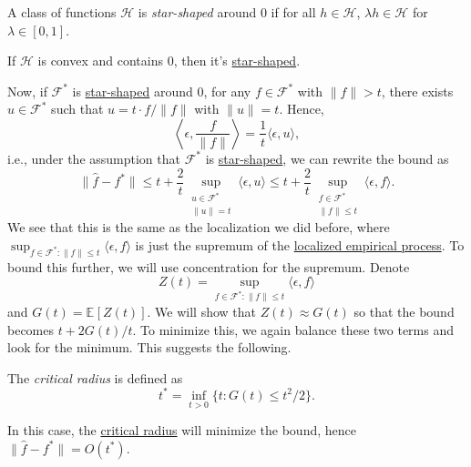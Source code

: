 \begin{definition}\label{def:star-shaped}
	A class of functions \(\mathscr{H} \) is \emph{star-shaped} around \(0\) if for all \(h\in \mathscr{H} \), \(\lambda h\in \mathscr{H} \) for \(\lambda \in [0, 1]\).
\end{definition}

\begin{eg}[Convex]
	If \(\mathscr{H} \) is convex and contains \(0\), then it's \hyperref[def:star-shaped]{star-shaped}.
\end{eg}

Now, if \(\mathscr{F} ^{\ast} \) is \hyperref[def:star-shaped]{star-shaped} around \(0\), for any \(f\in \mathscr{F} ^{\ast} \) with \(\lVert f \rVert > t\), there exists \(u \in \mathscr{F} ^{\ast} \) such that \(u = t \cdot f / \lVert f \rVert \) with \(\lVert u \rVert = t\). Hence,
\[
	\left\langle \epsilon , \frac{f}{\lVert f \rVert } \right\rangle
	= \frac{1}{t} \langle \epsilon , u \rangle ,
\]
i.e., under the assumption that \(\mathscr{F} ^{\ast} \) is \hyperref[def:star-shaped]{star-shaped}, we can rewrite the bound as
\[
	\lVert \hat{f} - f^{\ast} \rVert
	\leq t + \frac{2}{t} \sup _{\substack{u\in \mathscr{F} ^{\ast} \\ \lVert u \rVert = t}} \langle \epsilon , u \rangle
	\leq t + \frac{2}{t} \sup _{\substack{f\in \mathscr{F} ^{\ast} \\ \lVert f \rVert \leq t}} \langle \epsilon , f \rangle .
\]
We see that this is the same as the localization we did before, where \(\sup _{f\in \mathscr{F} ^{\ast} \colon \lVert f \rVert \leq t} \langle \epsilon , f \rangle \) is just the supremum of the \hyperref[def:localized-EP]{localized empirical process}. To bound this further, we will use concentration for the supremum. Denote
\[
	Z(t) = \sup _{f\in \mathscr{F} ^{\ast} \colon \lVert f \rVert \leq t} \langle \epsilon , f \rangle
\]
and \(G(t) = \mathbb{E}_{}\left[Z(t) \right] \). We will show that \(Z(t) \approx G(t)\) so that the bound becomes \(t + 2 G(t) / t\). To minimize this, we again balance these two terms and look for the minimum. This suggests the following.

\begin{definition}\label{def:critical-radius}
	The \emph{critical radius} is defined as
	\[
		t^{\ast} = \inf _{t > 0} \{ t \colon G(t) \leq t^2 / 2 \} .
	\]
\end{definition}

In this case, the \hyperref[def:critical-radius]{critical radius} will minimize the bound, hence \(\lVert \hat{f} - f^{\ast}  \rVert = O(t^{\ast} )\).